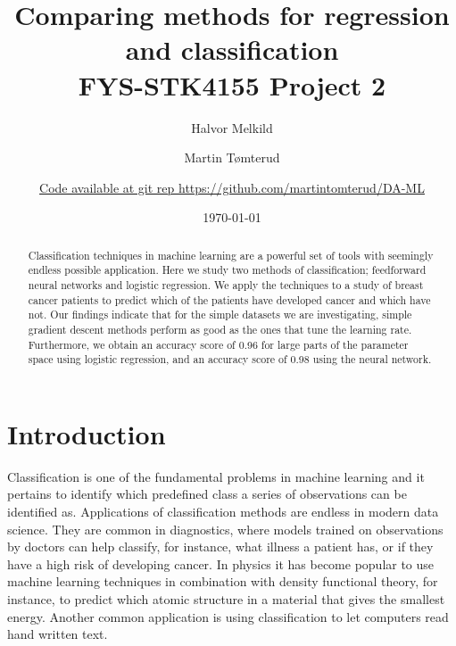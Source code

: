 \documentclass[a4paper, 
amsfonts, 
amssymb, 
amsmath, 
reprint, 
showkeys, 
nofootinbib, 
twoside]{revtex4-2}
\begin{document}
\title{ Comparing methods for regression and classification \\
FYS-STK4155 Project 2}

\author{Halvor Melkild}

\author{Martin Tømterud}

\author{\textcolor{blue}{\href{https://github.com/martintomterud/DA-ML}{Code available at git rep https://github.com/martintomterud/DA-ML}}} 

\date{\today} 

\begin{abstract}
Classification techniques in machine learning are a powerful set of tools with seemingly endless possible application. Here we study two methods of classification; feedforward neural networks and logistic regression. We apply the techniques to a study of breast cancer patients to predict which of the patients have developed cancer and which have not. Our findings indicate that for the simple datasets we are investigating, simple gradient descent methods perform as good as the ones that tune the learning rate. Furthermore, we obtain an accuracy score of 0.96 for large parts of the parameter space using logistic regression, and an accuracy score of 0.98 using the neural network.
\end{abstract}


\maketitle

\section{Introduction}

Classification is one of the fundamental problems in machine learning and it pertains to identify which predefined class a series of observations can be identified as. Applications of classification methods are endless in modern data science. They are common in diagnostics, where models trained on observations by doctors can help classify, for instance, what illness a patient has, or if they have a high risk of developing cancer. In physics it has become popular to use machine learning techniques in combination with density functional theory, for instance, to predict which atomic structure in a material that gives the smallest energy. Another common application is using classification to let computers read hand written text.
\end{document}
